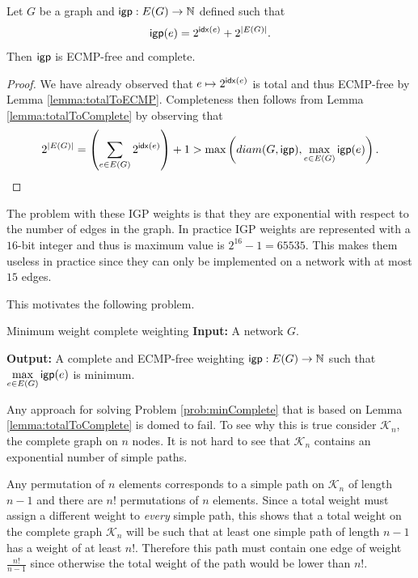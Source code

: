 \begin{corollary}
Let $G$ be a graph and $\mathsf{igp} : E(G) \rightarrow \mathbb{N}$ defined such that
$$
\mathsf{igp}(e) = 2^{\mathsf{idx}(e)} + 2^{|E(G)|}.
$$
Then $\mathsf{igp}$ is ECMP-free and complete.
\end{corollary}

\begin{proof}
We have already observed that $e \mapsto 2^{\mathsf{idx}(e)}$ is total and thus ECMP-free by Lemma \ref{lemma:totalToECMP}. Completeness then follows from
Lemma \ref{lemma:totalToComplete} by observing that 
$$
2^{|E(G)|} = \left( \sum_{e \in E(G)} 2^{\mathsf{idx}(e)} \right) + 1 > \max \left( diam(G, \mathsf{igp}), \displaystyle \max_{e \in E(G)} \mathsf{igp}(e) \right).
$$
\end{proof}

The problem with these IGP weights is that they are exponential with respect to the number of edges in the graph.
In practice IGP weights are represented with a $16$-bit integer and thus is maximum value is $2^{16} - 1 = 65535$.
This makes them useless in practice since they can only be implemented on a network with at most $15$ edges.

This motivates the following problem.

\begin{problem}{Minimum weight complete weighting}
\label{prob:minComplete}
\textbf{Input:} A network $G$.

\textbf{Output:} A complete and ECMP-free weighting $\mathsf{igp} : E(G) \rightarrow \mathbb{N}$ such that
$\displaystyle \max_{e \in E(G)} \mathsf{igp}(e)$ is minimum.
\end{problem}

Any approach for solving Problem \ref{prob:minComplete} that is based on Lemma \ref{lemma:totalToComplete} is domed to fail.
To see why this is true consider $\mathcal{K}_n$, the complete graph on $n$ nodes. It is not hard to see that $\mathcal{K}_n$ 
contains an exponential number of simple paths. 


Any permutation of $n$ elements corresponds to a simple path on $\mathcal{K}_n$ 
of length $n - 1$ and there are $n!$ permutations of $n$ elements. Since a total weight must assign a different weight to
\emph{every} simple path, this shows that a total weight on the complete graph $\mathcal{K}_n$ will be such that at least
one simple path of length $n - 1$ has a weight of at least $n!$. Therefore this path must contain one edge of weight
$\frac{n!}{n - 1}$ since otherwise the total weight of the path would be lower than $n!$.

